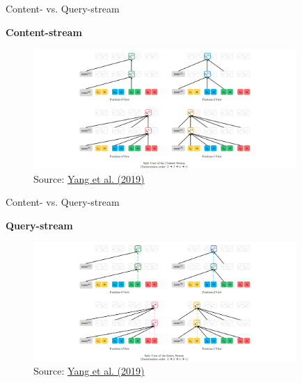 
\begin{frame}{Content- vs. Query-stream}

\vfill

	\textbf{Content-stream}
	
	\begin{figure}
		\centering
		\includegraphics[width = 10cm]{figure/xlnet-content.png}\\ 
		{\footnotesize Source: \href{https://papers.nips.cc/paper/8812-xlnet-generalized-autoregressive-pretraining-for-language-understanding.pdf}{Yang et al. (2019)}}
	\end{figure}
	
\vfill

\end{frame}


\begin{frame}{Content- vs. Query-stream}

\vfill

	\textbf{Query-stream}
	
	\begin{figure}
		\centering
		\includegraphics[width = 10cm]{figure/xlnet-query.png}\\ 
		{\footnotesize Source: \href{https://papers.nips.cc/paper/8812-xlnet-generalized-autoregressive-pretraining-for-language-understanding.pdf}{Yang et al. (2019)}}
	\end{figure}
	
\vfill

\end{frame}

